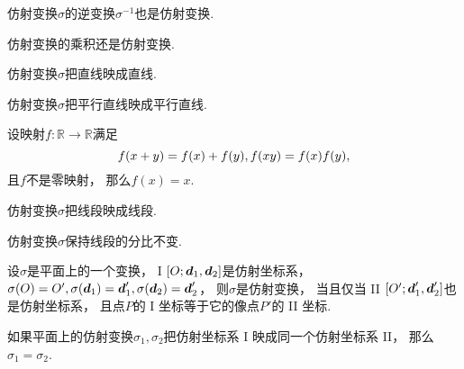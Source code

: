 \begin{property}
仿射变换\(\sigma\)的逆变换\(\sigma^{-1}\)也是仿射变换.
\end{property}

\begin{property}
仿射变换的乘积还是仿射变换.
\end{property}

\begin{property}
仿射变换\(\sigma\)把直线映成直线.
\end{property}

\begin{property}
仿射变换\(\sigma\)把平行直线映成平行直线.
\end{property}

\begin{lemma}
设映射\(f\colon \mathbb{R} \to \mathbb{R}\)满足\begin{equation*}
	f(x+y) = f(x) + f(y), \\
	f(xy) = f(x) f(y),
\end{equation*}
且\(f\)不是零映射，
那么\(f(x) = x\).
\end{lemma}

\begin{property}
仿射变换\(\sigma\)把线段映成线段.
\end{property}

\begin{property}
仿射变换\(\sigma\)保持线段的分比不变.
\end{property}

\begin{theorem}
设\(\sigma\)是平面上的一个变换，
I \([O;\boldsymbol{d}_1,\boldsymbol{d}_2]\)是仿射坐标系，
\(
	\sigma(O) = O',
	\sigma(\boldsymbol{d}_1) = \boldsymbol{d}'_1,
	\sigma(\boldsymbol{d}_2) = \boldsymbol{d}'_2
\)，
则\(\sigma\)是仿射变换，
当且仅当 II \([O';\boldsymbol{d}'_1,\boldsymbol{d}'_2]\)也是仿射坐标系，
且点\(P\)的 I 坐标等于它的像点\(P'\)的 II 坐标.
\end{theorem}

\begin{corollary}
如果平面上的仿射变换\(\sigma_1,\sigma_2\)把仿射坐标系 I 映成同一个仿射坐标系 II，
那么\(\sigma_1 = \sigma_2\).
\end{corollary}

